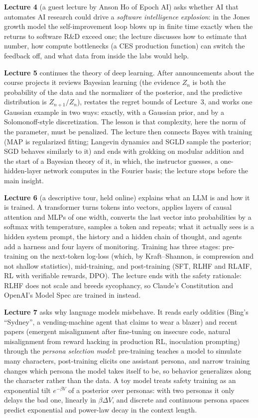\textbf{Lecture 4} (a guest lecture by Anson Ho of Epoch AI) asks whether AI that automates AI research could drive a \emph{software intelligence explosion}: in the Jones growth model the self-improvement loop blows up in finite time exactly when the returns to software R\&D exceed one; the lecture discusses how to estimate that number, how compute bottlenecks (a CES production function) can switch the feedback off, and what data from inside the labs would help.

\textbf{Lecture 5} continues the theory of deep learning. After announcements about the course projects it reviews Bayesian learning (the evidence $Z_n$ is both the probability of the data and the normalizer of the posterior, and the predictive distribution is $Z_{n+1}/Z_n$), restates the regret bounds of Lecture~3, and works one Gaussian example in two ways: exactly, with a Gaussian prior, and by a Solomonoff-style discretization. The lesson is that complexity, here the norm of the parameter, must be penalized. The lecture then connects Bayes with training (MAP is regularized fitting; Langevin dynamics and SGLD sample the posterior; SGD behaves similarly to it) and ends with grokking on modular addition and the start of a Bayesian theory of it, in which, the instructor guesses, a one-hidden-layer network computes in the Fourier basis; the lecture stops before the main insight.

\textbf{Lecture 6} (a descriptive tour, held online) explains what an LLM is and how it is trained. A transformer turns tokens into vectors, applies layers of causal attention and MLPs of one width, converts the last vector into probabilities by a softmax with temperature, samples a token and repeats; what it actually sees is a hidden system prompt, the history and a hidden chain of thought, and agents add a harness and four layers of monitoring. Training has three stages: pre-training on the next-token log-loss (which, by Kraft--Shannon, is compression and not shallow statistics), mid-training, and post-training (SFT, RLHF and RLAIF, RL with verifiable rewards, DPO). The lecture ends with the safety rationale: RLHF does not scale and breeds sycophancy, so Claude's Constitution and OpenAI's Model Spec are trained in instead.

\textbf{Lecture 7} asks why language models misbehave. It reads early oddities (Bing's ``Sydney'', a vending-machine agent that claims to wear a blazer) and recent papers (emergent misalignment after fine-tuning on insecure code, natural misalignment from reward hacking in production RL, inoculation prompting) through the \emph{persona selection model}: pre-training teaches a model to simulate many characters, post-training elicits one assistant persona, and narrow training changes which persona the model takes itself to be, so behavior generalizes along the character rather than the data. A toy model treats safety training as an exponential tilt $e^{-\beta V}$ of a posterior over personas: with two personas it only delays the bad one, linearly in $\beta\Delta V$, and discrete and continuous persona spaces predict exponential and power-law decay in the context length.

